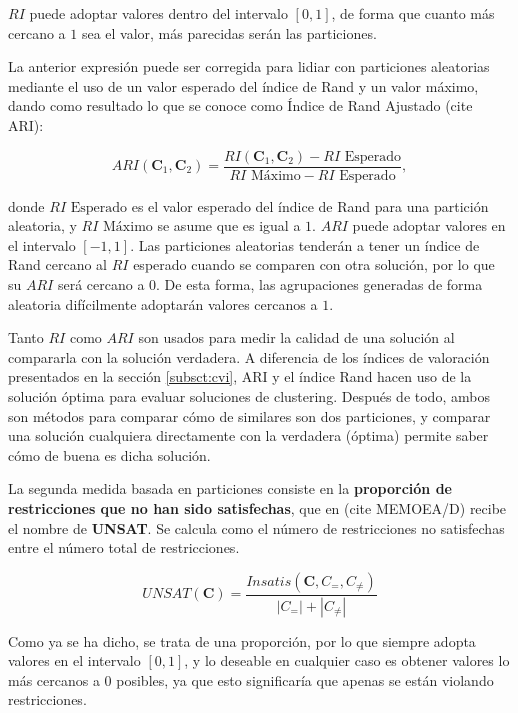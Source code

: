 $RI$ puede adoptar valores dentro del intervalo $[0,1]$, de forma que cuanto más cercano a $1$ sea el valor, más parecidas serán las particiones.

La anterior expresión puede ser corregida para lidiar con particiones aleatorias mediante el uso de un valor esperado del índice de Rand y un valor máximo, dando como resultado lo que se conoce como Índice de Rand Ajustado (cite ARI):

\begin{equation}
	ARI(\textbf{C}_1,\textbf{C}_2) = \frac{RI(\textbf{C}_1,\textbf{C}_2) - RI\text{ Esperado}}{RI\text{ Máximo} - RI\text{ Esperado}},
\end{equation}

donde $RI\text{ Esperado}$ es el valor esperado del índice de Rand para una partición aleatoria, y $RI\text{ Máximo}$ se asume que es igual a $1$. $ARI$ puede adoptar valores en el intervalo $[-1,1]$. Las particiones aleatorias tenderán a tener un índice de Rand cercano al $RI$ esperado cuando se comparen con otra solución, por lo que su $ARI$ será cercano a 0. De esta forma, las agrupaciones generadas de forma aleatoria difícilmente adoptarán valores cercanos a $1$.

Tanto $RI$ como $ARI$ son usados para medir la calidad de una solución al compararla con la solución verdadera. A diferencia de los índices de valoración presentados en la sección \ref{subsct:cvi}, ARI y el índice Rand hacen uso de la solución óptima para evaluar soluciones de clustering. Después de todo, ambos son métodos para comparar cómo de similares son dos particiones, y comparar una solución cualquiera directamente con la verdadera (óptima) permite saber cómo de buena es dicha solución.

La segunda medida basada en particiones consiste en la \textbf{proporción de restricciones que no han sido satisfechas}, que en (cite MEMOEA/D) recibe el nombre de \textbf{UNSAT}. Se calcula como el número de restricciones no satisfechas entre el número total de restricciones.

\begin{equation}
	UNSAT(\textbf{C}) = \frac{Insatis(\textbf{C}, C_{=}, C_{\not=})}{|C_{=}| + |C_{\not=}|}
\end{equation}

Como ya se ha dicho, se trata de una proporción, por lo que siempre adopta valores en el intervalo $[0,1]$, y lo deseable en cualquier caso es obtener valores lo más cercanos a $0$ posibles, ya que esto significaría que apenas se están violando restricciones.

